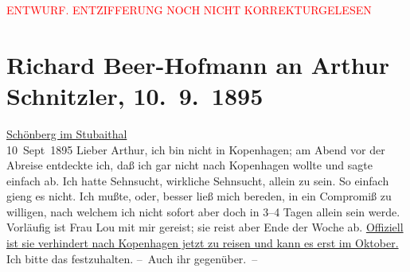 
\begin{center}
            \textcolor{red}{ENTWURF. ENTZIFFERUNG NOCH NICHT KORREKTURGELESEN}
                      \end{center}
            
               \section[Richard Beer-Hofmann an Arthur Schnitzler, 10. 9. 1895]{ Richard Beer-Hofmann an Arthur Schnitzler,
               10. 9. 1895}\nopagebreak{}\rehead{ }\begin{ledgroupsized}[t]{13cm}\normalsize\beginnumbering{} \toendnotes[C]{\smallbreak\pagebreak[2]} 
\pstart
           \raggedleft{}{\pb}\uline{Schönberg im
                        Stubaithal}{\\}10 Sept 1895\pend
           \pstart
           Lieber Arthur, ich bin nicht in Kopenhagen; am Abend vor der Abreise entdeckte ich, daß ich gar nicht nach
                  Kopenhagen wollte und sagte einfach ab. Ich
               hatte Sehnsucht, wirkliche Sehnsucht, allein zu sein. So einfach gieng es nicht. Ich
               mußte, oder, besser ließ mich bereden, in ein Compromiß zu willigen,  nach welchem ich nicht sofort aber doch in 3–4
               Tagen allein sein werde. Vorläufig ist {\pb}Frau Lou mit mir gereist; sie reist aber Ende der Woche ab. \uline{Offiziell ist sie verhindert nach Kopenhagen jetzt zu reisen und kann es erst im Oktober.} Ich bitte
               das festzuhalten.\pend
           \pstart
           – Auch ihr gegenüber. –\pend

\end{ledgroupsized}
